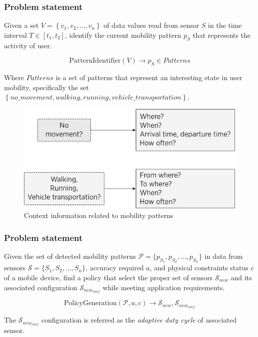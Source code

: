 \documentclass[compress,9pt,xcolor={dvipsnames,table}]{beamer}
\begin{document}
\begin{frame}\frametitle{Problem statement}
\begin{tcolorbox}[title=Problem statement: Mobility pattern identification,colframe=PineGreen]
\small
Given a set $V = \left\{v_{1}, v_{2}, \dotsc, v_{n}\right\}$ of data values read from sensor $S$ in the time interval $T  \in [t_{1}, t_{2}]$, identify the current mobility pattern $p_{S}$ that represents the activity of user.

\begin{equation}
  \text{PatternIdentifier}( V ) \longrightarrow{} p_{S} \in Patterns
\end{equation}

Where $Patterns$ is a set of patterns that represent an interesting state in user mobility, specifically the set $\left\{no\_movement, walking, running, vehicle\_transportation\right\}$.

\begin{figure}[tb]
  \centering
  \includegraphics[scale=0.5]{../../../resources/images/vectors/mobility-patterns-implications}
  \caption{Context information related to mobility patterns}
  \label{fig:mobility-patterns-implications}
\end{figure}

\end{tcolorbox}




\end{frame}

\begin{frame}\frametitle{Problem statement}
\begin{tcolorbox}[title=Problem statement: Policy generation,colframe=PineGreen]
\small
Given the set of detected mobility patterns $\mathcal{P} = \{ p_{S_1}, p_{S_2}, \ldots, p_{S_n} \}$ in data from sensors $\mathcal{S} = \{ S_1,S_2,\ldots, S_n \}$, accuracy required $a$, and physical constraints status $c$ of a mobile device, find a policy that select the proper set of sensors $\mathcal{S}_{new}$ and its associated configuration $\mathcal{S}_{new_{conf}}$  while meeting application requirements.

\begin{equation}
  \text{PolicyGeneration}( \mathcal{P}, a, c ) \longrightarrow{} \mathcal{S}_{new}, \mathcal{S}_{new_{conf}}
\end{equation}

The $\mathcal{S}_{new_{conf}}$ configuration is referred as the \emph{adaptive duty cycle} of associated sensor.
\end{tcolorbox}
\end{frame}
\end{document}
